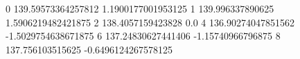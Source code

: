 0 139.59573364257812 1.1900177001953125
1 139.996337890625 1.5906219482421875
2 138.4057159423828 0.0
4 136.90274047851562 -1.5029754638671875
6 137.24830627441406 -1.15740966796875
8 137.756103515625 -0.6496124267578125

